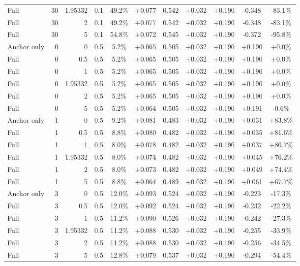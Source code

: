 \begin{table}[htbp]
\begin{tabular}{lrrrccccccc}
Full & 30 & 1.95332 & 0.1 & 49.2\% & +0.077 & 0.542 & +0.032 & +0.190 & -0.348 & -83.1\% \\
Full & 30 & 2 & 0.1 & 49.2\% & +0.077 & 0.542 & +0.032 & +0.190 & -0.348 & -83.1\% \\
Full & 30 & 5 & 0.1 & 54.8\% & +0.072 & 0.545 & +0.032 & +0.190 & -0.372 & -95.8\% \\
Anchor only & 0 & 0 & 0.5 & 5.2\% & +0.065 & 0.505 & +0.032 & +0.190 & +0.190 & +0.0\% \\
Full & 0 & 0.5 & 0.5 & 5.2\% & +0.065 & 0.505 & +0.032 & +0.190 & +0.190 & +0.0\% \\
Full & 0 & 1 & 0.5 & 5.2\% & +0.065 & 0.505 & +0.032 & +0.190 & +0.190 & +0.0\% \\
Full & 0 & 1.95332 & 0.5 & 5.2\% & +0.065 & 0.505 & +0.032 & +0.190 & +0.190 & +0.0\% \\
Full & 0 & 2 & 0.5 & 5.2\% & +0.065 & 0.505 & +0.032 & +0.190 & +0.190 & +0.0\% \\
Full & 0 & 5 & 0.5 & 5.2\% & +0.064 & 0.505 & +0.032 & +0.190 & +0.191 & -0.6\% \\
Anchor only & 1 & 0 & 0.5 & 9.2\% & +0.081 & 0.483 & +0.032 & +0.190 & +0.031 & +83.8\% \\
Full & 1 & 0.5 & 0.5 & 8.8\% & +0.080 & 0.482 & +0.032 & +0.190 & +0.035 & +81.6\% \\
Full & 1 & 1 & 0.5 & 8.0\% & +0.078 & 0.482 & +0.032 & +0.190 & +0.037 & +80.7\% \\
Full & 1 & 1.95332 & 0.5 & 8.0\% & +0.074 & 0.482 & +0.032 & +0.190 & +0.045 & +76.2\% \\
Full & 1 & 2 & 0.5 & 8.0\% & +0.073 & 0.482 & +0.032 & +0.190 & +0.049 & +74.4\% \\
Full & 1 & 5 & 0.5 & 8.8\% & +0.064 & 0.489 & +0.032 & +0.190 & +0.061 & +67.7\% \\
Anchor only & 3 & 0 & 0.5 & 12.0\% & +0.093 & 0.524 & +0.032 & +0.190 & -0.223 & -17.3\% \\
Full & 3 & 0.5 & 0.5 & 12.0\% & +0.092 & 0.524 & +0.032 & +0.190 & -0.232 & -22.2\% \\
Full & 3 & 1 & 0.5 & 11.2\% & +0.090 & 0.526 & +0.032 & +0.190 & -0.242 & -27.3\% \\
Full & 3 & 1.95332 & 0.5 & 11.2\% & +0.088 & 0.530 & +0.032 & +0.190 & -0.255 & -33.9\% \\
Full & 3 & 2 & 0.5 & 11.2\% & +0.088 & 0.530 & +0.032 & +0.190 & -0.256 & -34.5\% \\
Full & 3 & 5 & 0.5 & 12.8\% & +0.079 & 0.537 & +0.032 & +0.190 & -0.294 & -54.4\% \\

\end{tabular}
\end{table}
